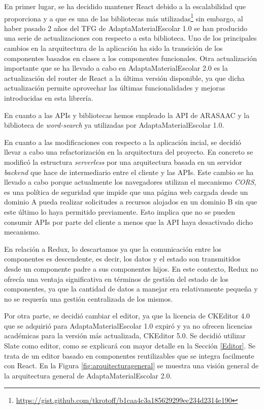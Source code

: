 En primer lugar, se ha decidido mantener React debido a la escalabilidad que proporciona y a que es una de las bibliotecas más utilizadas\footnote{\url{https://gist.github.com/tkrotoff/b1caa4c3a185629299ec234d2314e190}} sin embargo, al haber pasado 2 años del TFG de AdaptaMaterialEscolar 1.0 se han producido una serie de actualizaciones con respecto a esta biblioteca. Uno de los principales cambios en la arquitectura de la aplicación ha sido la transición de los componentes basados en clases a los componentes funcionales. Otra actualización importante que se ha llevado a cabo en AdaptaMaterialEscolar 2.0 es la actualización del router de React a la última versión disponible, ya que dicha actualización  permite aprovechar las últimas funcionalidades y mejoras introducidas en esta librería.

En cuanto a las APIs y bibliotecas hemos empleado la API de ARASAAC y la biblioteca de \textit{word-search} ya utilizadas por AdaptaMaterialEscolar 1.0.

En cuanto a las modificaciones con respecto a la aplicación incial, se decidió llevar a cabo una refactorización en la arquitectura del proyecto. En concreto se modificó la estructura \textit{serverless} por una arquitectura basada en un servidor \textit{backend} que hace de intermediario entre el cliente y las APIs. Este cambio se ha llevado a cabo porque actualmente los navegadores utilizan el mecanismo \textit{CORS}, es una política de  seguridad que impide que una página web cargada desde un dominio A pueda realizar solicitudes a recursos alojados en un dominio B sin que este último lo haya permitido previamente. Esto implica que no se pueden consumir APIs por parte del cliente a menos que la API haya desactivado dicho mecanismo.

En relación a Redux, lo descartamos ya que la comunicación entre los componentes es descendente, es decir, los datos y el estado son transmitidos desde un componente padre a sus componentes hijos. En este contexto, Redux no ofrecía una ventaja significativa en términos de gestión del estado de los componentes, ya que la cantidad de datos a manejar era relativamente pequeña y no se requería una gestión centralizada de los mismos.

Por otra parte, se decidió cambiar el editor, ya que la licencia de CKEditor 4.0 que se adquirió para AdaptaMaterialEscolar 1.0 expiró y ya no ofrecen licencias académicas para la versión más actualizada, CKEditor 5.0. Se decidió utilizar Slate como editor, como se explicará con mayor detalle en la Sección \ref{Editor}. Se trata de un editor basado en componentes reutilizables que se integra facilmente con React. En la Figura \ref{fig:arquitecturageneral} se muestra una visión general de la arquitectura general de AdaptaMaterialEscolar 2.0.


